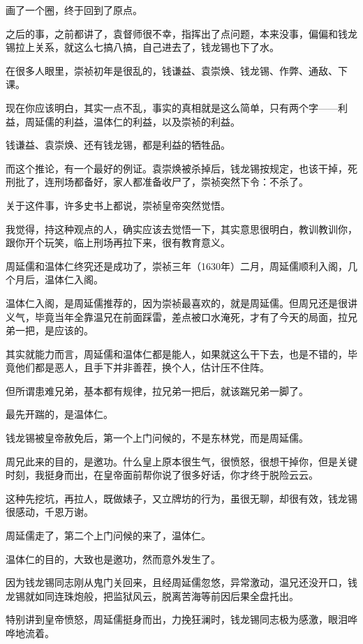 \begin{multicols}{\theparacolNo}
		画了一个圈，终于回到了原点。

		之后的事，之前都讲了，袁督师很不幸，指挥出了点问题，本来没事，偏偏和钱龙锡拉上关系，就这么七搞八搞，自己进去了，钱龙锡也下了水。

		在很多人眼里，崇祯初年是很乱的，钱谦益、袁崇焕、钱龙锡、作弊、通敌、下课。

		现在你应该明白，其实一点不乱，事实的真相就是这么简单，只有两个字——利益，周延儒的利益，温体仁的利益，以及崇祯的利益。

		钱谦益、袁崇焕、还有钱龙锡，都是利益的牺牲品。

		而这个推论，有一个最好的例证。袁崇焕被杀掉后，钱龙锡按规定，也该干掉，死刑批了，连刑场都备好，家人都准备收尸了，崇祯突然下令：不杀了。

		关于这件事，许多史书上都说，崇祯皇帝突然觉悟。

		我觉得，持这种观点的人，确实应该去觉悟一下，其实意思很明白，教训教训你，跟你开个玩笑，临上刑场再拉下来，很有教育意义。

		周延儒和温体仁终究还是成功了，崇祯三年（1630年）二月，周延儒顺利入阁，几个月后，温体仁入阁。

		温体仁入阁，是周延儒推荐的，因为崇祯最喜欢的，就是周延儒。但周兄还是很讲义气，毕竟当年全靠温兄在前面踩雷，差点被口水淹死，才有了今天的局面，拉兄弟一把，是应该的。

		其实就能力而言，周延儒和温体仁都是能人，如果就这么干下去，也是不错的，毕竟他们都是恶人，且手下并非善茬，换个人，估计压不住阵。

		但所谓患难兄弟，基本都有规律，拉兄弟一把后，就该踹兄弟一脚了。

		最先开踹的，是温体仁。

		钱龙锡被皇帝赦免后，第一个上门问候的，不是东林党，而是周延儒。

		周兄此来的目的，是邀功。什么皇上原本很生气，很愤怒，很想干掉你，但是关键时刻，我挺身而出，在皇帝面前帮你说了很多好话，你才终于脱险云云。

		这种先挖坑，再拉人，既做婊子，又立牌坊的行为，虽很无聊，却很有效，钱龙锡很感动，千恩万谢。

		周延儒走了，第二个上门问候的来了，温体仁。

		温体仁的目的，大致也是邀功，然而意外发生了。

		因为钱龙锡同志刚从鬼门关回来，且经周延儒忽悠，异常激动，温兄还没开口，钱龙锡就如同连珠炮般，把监狱风云，脱离苦海等前因后果全盘托出。

		特别讲到皇帝愤怒，周延儒挺身而出，力挽狂澜时，钱龙锡同志极为感激，眼泪哗哗地流着。


\end{multicols}

